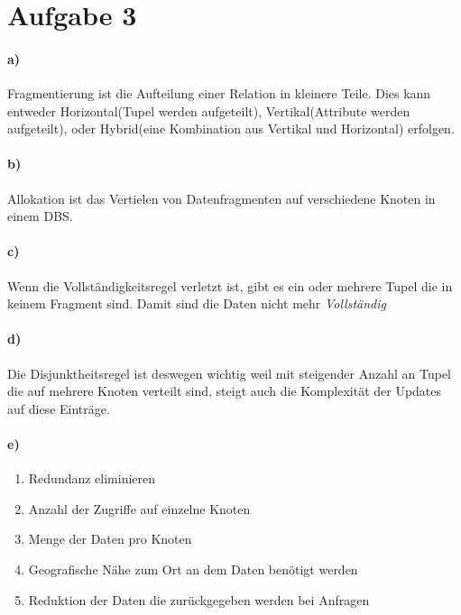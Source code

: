 \documentclass[11pt,a4paper,parskip=half ]{scrartcl}
\begin{document}
	\begin{lstlisting}[language=SQL]
	
	\end{lstlisting}
	
	
	
	
	
	
	\section*{Aufgabe 3}
	\paragraph{a)} Fragmentierung ist die Aufteilung einer Relation in kleinere Teile. Dies kann entweder Horizontal(Tupel werden aufgeteilt), Vertikal(Attribute werden aufgeteilt), oder Hybrid(eine Kombination aus Vertikal und Horizontal) erfolgen.
	
	\paragraph{b)} Allokation ist das Vertielen von Datenfragmenten auf verschiedene Knoten in einem DBS.
	
	\paragraph{c)} Wenn die Vollständigkeitsregel verletzt ist, gibt es ein oder mehrere Tupel die in keinem Fragment sind. Damit sind die Daten nicht mehr \textit{Vollständig}
	
	\paragraph{d)} Die Disjunktheitsregel ist deswegen wichtig weil mit steigender Anzahl an Tupel die auf mehrere Knoten verteilt sind, steigt auch die Komplexität der Updates auf diese Einträge.
	
	\paragraph{e)}
	\begin{enumerate}
		\item Redundanz eliminieren
		\item Anzahl der Zugriffe auf einzelne Knoten
		\item Menge der Daten pro Knoten
		\item Geografische Nähe zum Ort an dem Daten benötigt werden
		\item Reduktion der Daten die zurückgegeben werden bei Anfragen
	\end{enumerate}
	
	
	
\end{document}

